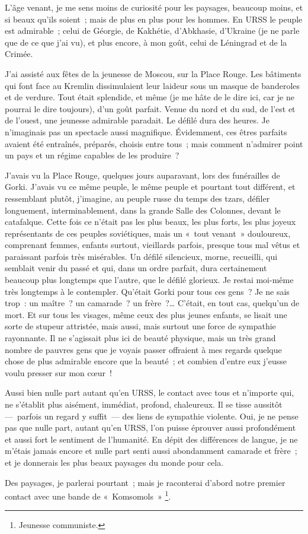\documentclass[twoside]{book} %
\begin{document}
\noindent L’âge venant, je me sens moins de curiosité pour les paysages, beaucoup moins, et si beaux qu’ils soient ; mais de plus en plus pour les hommes. En URSS le peuple est admirable ; celui de Géorgie, de Kakhétie, d’Abkhasie, d’Ukraine (je ne parle que de ce que j’ai vu), et plus encore, à mon goût, celui de Léningrad et de la Crimée.\par
J’ai assisté aux fêtes de la jeunesse de Moscou, sur la Place Rouge. Les bâtiments qui font face au Kremlin dissimulaient leur laideur sous un masque de banderoles et de verdure. Tout était splendide, et même (je me hâte de le dire ici, car je ne pourrai le dire toujours), d’un goût parfait. Venue du nord et du sud, de l’est et de l’ouest, une jeunesse admirable paradait. Le défilé dura des heures. Je n’imaginais pas un spectacle aussi magnifique. Évidemment, ces êtres parfaits avaient été entraînés, préparés, choisis entre tous ; mais comment n’admirer point un pays et un régime capables de les produire ?\par
J’avais vu la Place Rouge, quelques jours auparavant, lors des funérailles de Gorki. J’avais vu ce même peuple, le même peuple et pourtant tout différent, et ressemblant plutôt, j’imagine, au peuple russe du temps des tzars, défiler longuement, interminablement, dans la grande Salle des Colonnes, devant le catafalque. Cette fois ce n’était pas les plus beaux, les plus forts, les plus joyeux représentants de ces peuples soviétiques, mais un « tout venant » douloureux, comprenant femmes, enfants surtout, vieillards parfois, presque tous mal vêtus et paraissant parfois très misérables. Un défilé silencieux, morne, recueilli, qui semblait venir du passé et qui, dans un ordre parfait, dura certainement beaucoup plus longtemps que l’autre, que le défilé glorieux. Je restai moi-même très longtemps à le contempler. Qu’était Gorki pour tous ces gens ? Je ne sais trop : un maître ? un camarade ? un frère ?… C’était, en tout cas, quelqu’un de mort. Et sur tous les visages, même ceux des plus jeunes enfants, se lisait une sorte de stupeur attristée, mais aussi, mais surtout une force de sympathie rayonnante. Il ne s’agissait plus ici de beauté physique, mais un très grand nombre de pauvres gens que je voyais passer offraient à mes regards quelque chose de plus admirable encore que la beauté ; et combien d’entre eux j’eusse voulu presser sur mon cœur !\par
Aussi bien nulle part autant qu’en URSS, le contact avec tous et n’importe qui, ne s’établit plus aisément, immédiat, profond, chaleureux. Il se tisse aussitôt — parfois un regard y suffit — des liens de sympathie violente. Oui, je ne pense pas que nulle part, autant qu’en URSS, l’on puisse éprouver aussi profondément et aussi fort le sentiment de l’humanité. En dépit des différences de langue, je ne m’étais jamais encore et nulle part senti aussi abondamment camarade et frère ; et je donnerais les plus beaux paysages du monde pour cela.\par
Des paysages, je parlerai pourtant ; mais je raconterai d’abord notre premier contact avec une bande de « Komsomols » \footnote{Jeunesse communiste.}.\par
\end{document}
